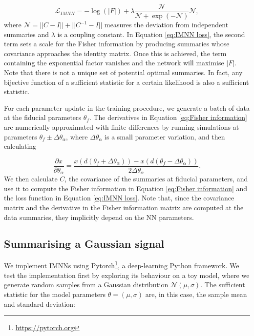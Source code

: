\begin{equation}\label{eq:IMNN loss}
    \mathcal{L}_{IMNN} = - \log(|F|) + \lambda \frac{\mathcal{N}}{\mathcal{N}+\exp(-\mathcal{N})} \mathcal{N},
\end{equation}
where $\mathcal{N}=||C-I||+||C^{-1}-I||$ measures the deviation from independent summaries and $\lambda$ is a coupling constant. In Equation \ref{eq:IMNN loss}, the second term sets a scale for the Fisher information by producing summaries whose covariance approaches the identity matrix. Once this is achieved, the term containing the exponential factor vanishes and the network will maximise $|F|$. Note that there is not a unique set of potential optimal summaries. In fact, any bijective function of a sufficient statistic for a certain likelihood is also a sufficient statistic.

For each parameter update in the training procedure, we generate a batch of data at the fiducial parameters $\theta_f$. The derivatives in Equation \ref{eq:Fisher information} are numerically approximated with finite differences by running simulations at parameters $\theta_f \pm \Delta \theta_\alpha$, where $\Delta \theta_\alpha$ is a small parameter variation, and then calculating

\begin{equation}
    \frac{\partial x}{\partial \theta_\alpha}=\frac{x(d(\theta_f + \Delta \theta_\alpha))-x(d(\theta_f - \Delta \theta_\alpha))}{2 \Delta \theta_\alpha}.
\end{equation}
We then calculate $C$, the covariance of the summaries at fiducial parameters, and use it to compute the Fisher information in Equation \ref{eq:Fisher information} and the loss function in Equation \ref{eq:IMNN loss}. Note that, since the covariance matrix and the derivative in the Fisher information matrix are computed at the data summaries, they implicitly depend on the NN parameters.

\subsection{Summarising a Gaussian signal}\label{sec:IMNN normal}
We implement IMNNs using Pytorch\footnote{\url{https://pytorch.org}}, a deep-learning Python framework. We test the implementation first by exploring its behaviour on a toy model, where we generate random samples from a Gaussian distribution $\mathcal{N}(\mu, \sigma)$. The sufficient statistic for the model parameters $\theta=(\mu,\sigma)$ are, in this case, the sample mean and standard deviation:

